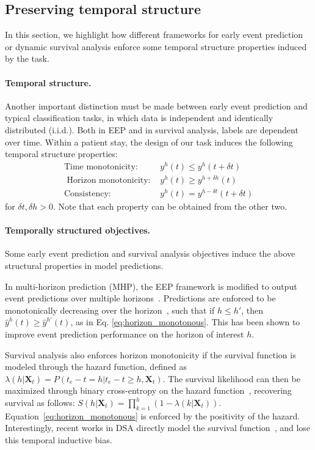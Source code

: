 \documentclass[nohyperref]{article}
\begin{document}
\subsection{Preserving temporal structure}
\label{sec:temp_structure}
In this section, we highlight how different frameworks for early event prediction or dynamic survival analysis enforce some temporal structure properties induced by the task.

\paragraph{Temporal structure.} Another important distinction must be made between early event prediction and typical classification tasks, in which data is independent and identically distributed (i.i.d.). Both in EEP and in survival analysis, labels are dependent over time. Within a patient stay, the design of our task induces the following temporal structure properties:
 \begin{align}
 \text{Time monotonicity: } &y^h(t) \leq y^h(t+\delta t) \label{eq:time_monotonous} \\ 
\text{ Horizon monotonicity: } &y^h(t) \geq y^{h+\delta h}(t) \label{eq:horizon_monotonous} \\
\text{Consistency: } & y^h (t) = y^{h - \delta t} (t+\delta t)   \label{eq:time_consistency}
\end{align}
for $\delta t, \delta h >0 $. Note that each property can be obtained from the other two.






\paragraph{Temporally structured objectives.} Some early event prediction and survival analysis objectives induce the above structural properties in model predictions.


In multi-horizon prediction (MHP), the EEP framework is modified to output event predictions over multiple horizons~\cite{tomavsev2019,tomavsev2021,roy2021multitask}. Predictions are enforced to be monotonically decreasing over the horizon~\citep{tomavsev2019}, such that if $h \leq h'$, then $\hat{y}^{h}(t) \geq \hat{y}^{h'}(t)$, as in Eq. \ref{eq:horizon_monotonous}. This has been shown to improve event prediction performance on the horizon of interest $h$. 


Survival analysis also enforces horizon monotonicity if the survival function is modeled through the hazard function, defined as $\lambda(h \vert \mathbf{X}_t) = P(t_e-t = h | t_e-t \geq h, \mathbf{X}_t)$.
The survival likelihood can then be maximized through binary cross-entropy on the hazard function~\cite{kalbfleisch2011statistical,craig2021survival}, recovering survival as follows: $S(h \vert \mathbf{X}_t) =  \prod_{k=1}^h \left( 1 - \lambda(k \vert \mathbf{X}_t)\right)$. Equation~\ref{eq:horizon_monotonous} is enforced by the positivity of the hazard. Interestingly, recent works in DSA directly model the survival function~\cite{lee2019dynamic,jarrett2019dynamic}, and lose this temporal inductive bias.
\end{document}
